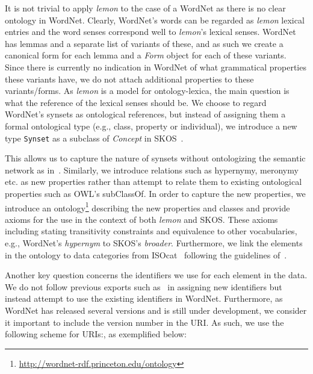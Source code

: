 \documentclass[10pt, a4paper]{article}
\newcommand{\lemon}[0]{\emph{lemon}}
\begin{document}
It is not trivial to apply \lemon{} to the case of a WordNet as there is no
clear ontology in WordNet.
Clearly, WordNet's 
words can be regarded as \lemon{} lexical entries and the word senses correspond
well to \lemon{}'s lexical senses. WordNet has lemmas and a separate list of
variants of these, and as such we create a canonical form for each lemma and  
a \emph{Form} object for each of these variants. Since there is currently no indication in
WordNet of what grammatical properties these variants have, we do not attach additional properties to these variants/forms. As \lemon{} is a model for
ontology-lexica, the main question is what the reference of the lexical senses should be.
We choose to regard WordNet's synsets as ontological references, but instead of assigning them a formal ontological type (e.g.,
class, property or individual), we introduce a new type {\tt Synset} as a subclass of \emph{Concept} in SKOS~\cite{miles2007skos}.

This allows us to capture the nature of synsets without
ontologizing the semantic network as in~\cite{gangemi2003ontowordnet}.
Similarly, we introduce relations such as hypernymy, meronymy etc. as new
properties rather than attempt to relate them to existing ontological
properties such as OWL's subClassOf. In order to capture the new properties, we
introduce an ontology\footnote{\url{http://wordnet-rdf.princeton.edu/ontology}}
describing the new properties and classes and provide
axioms for the use in the context of both \lemon{} and SKOS. These axioms including
stating transitivity constraints and equivalence to other vocabularies, e.g., WordNet's 
\emph{hypernym} to SKOS's \emph{broader}.
Furthermore, we
link the elements in the ontology to data categories from
ISOcat~\cite{kemps2008isocat} following the guidelines
of~\cite{windhouwer2012linking}.

Another key question concerns the identifiers we use for each element in the data.
We do not follow previous exports such as~\cite{van2006conversion} in assigning new identifiers
but instead attempt to use the existing identifiers in WordNet. Furthermore, as
WordNet has released several versions and is still under development, we consider it 
important to include the version number in the URI. As such, we use the
following scheme for URIs:, as exemplified below:
\end{document}
